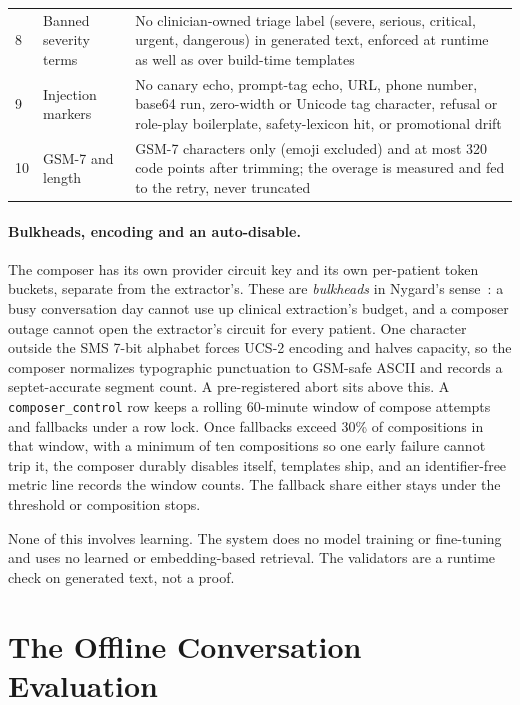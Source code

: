 \begin{table}[htbp]
\begin{tabular}{@{}p{0.5cm}>{\raggedright\arraybackslash}p{3.2cm}>{\raggedright\arraybackslash}p{9.6cm}@{}}
    8 & Banned severity terms &
      \raggedright No clinician-owned triage label (severe, serious, critical, urgent,
      dangerous) in generated text, enforced at runtime as well as over build-time
      templates \tabularnewline
    9 & Injection markers &
      \raggedright No canary echo, prompt-tag echo, URL, phone number, base64 run,
      zero-width or Unicode tag character, refusal or role-play boilerplate, safety-lexicon
      hit, or promotional drift \tabularnewline
    10 & GSM-7 and length &
      \raggedright GSM-7 characters only (emoji excluded) and at most 320 code points after
      trimming; the overage is measured and fed to the retry, never truncated \tabularnewline
    \bottomrule
  \end{tabular}
\end{table}

\paragraph{Bulkheads, encoding and an auto-disable.}
The composer has its own provider circuit key and its own per-patient token
buckets, separate from the extractor's. These are \emph{bulkheads} in Nygard's
sense~\cite{nygard2018releaseit}: a busy conversation day cannot use up clinical
extraction's budget, and a composer outage cannot open the extractor's circuit
for every patient. One character outside the SMS 7-bit alphabet forces UCS-2
encoding and halves capacity, so the composer normalizes typographic punctuation
to GSM-safe ASCII and records a septet-accurate segment count. A pre-registered
abort sits above this. A \texttt{composer\_control} row keeps a rolling 60-minute
window of compose attempts and fallbacks under a row lock. Once fallbacks exceed
30\% of compositions in that window, with a minimum of ten compositions so one
early failure cannot trip it, the composer durably disables itself, templates
ship, and an identifier-free metric line records the window counts. The fallback
share either stays under the threshold or composition stops.

None of this involves learning. The system does no model training or fine-tuning
and uses no learned or embedding-based retrieval. The validators are a runtime
check on generated text, not a proof.

\section{The Offline Conversation Evaluation}
\label{sec:conv-offline}

